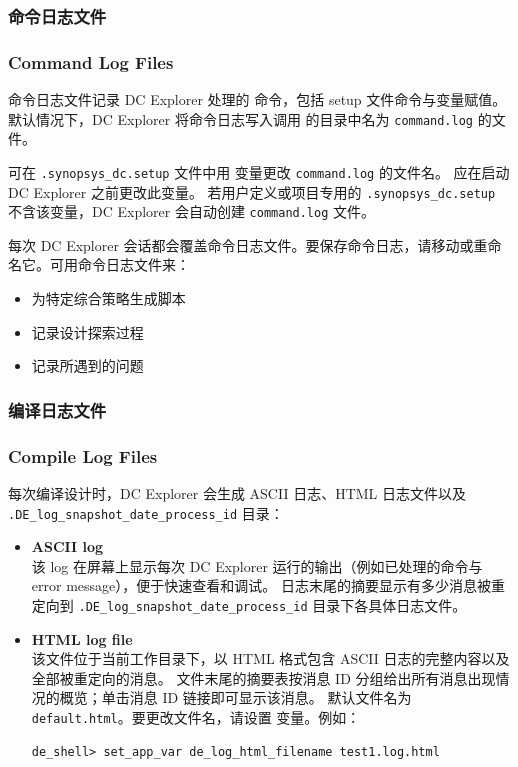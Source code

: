 \subsubsection{命令日志文件}
\subsubsection*{Command Log Files}

命令日志文件记录 DC Explorer 处理的  命令，包括 setup 文件命令与变量赋值。
默认情况下，DC Explorer 将命令日志写入调用  的目录中名为 \texttt{command.log} 的文件。

可在 \texttt{.synopsys\_dc.setup} 文件中用  变量更改 \texttt{command.log} 的文件名。
应在启动 DC Explorer 之前更改此变量。
若用户定义或项目专用的 \texttt{.synopsys\_dc.setup} 不含该变量，DC Explorer 会自动创建 \texttt{command.log} 文件。

每次 DC Explorer 会话都会覆盖命令日志文件。要保存命令日志，请移动或重命名它。可用命令日志文件来：
\begin{itemize}
  \item 为特定综合策略生成脚本
  \item 记录设计探索过程
  \item 记录所遇到的问题
\end{itemize}

\subsubsection{编译日志文件}
\subsubsection*{Compile Log Files}

每次编译设计时，DC Explorer 会生成 ASCII 日志、HTML 日志文件以及
\texttt{.DE\_log\_snapshot\_date\_process\_id} 目录：
\begin{itemize}
  \item \textbf{ASCII log}\\
        该 log 在屏幕上显示每次 DC Explorer 运行的输出（例如已处理的命令与 error message），便于快速查看和调试。
        日志末尾的摘要显示有多少消息被重定向到 \texttt{.DE\_log\_snapshot\_date\_process\_id} 目录下各具体日志文件。

  \item \textbf{HTML log file}\\
        该文件位于当前工作目录下，以 HTML 格式包含 ASCII 日志的完整内容以及全部被重定向的消息。
        文件末尾的摘要表按消息 ID 分组给出所有消息出现情况的概览；单击消息 ID 链接即可显示该消息。
        默认文件名为 \texttt{default.html}。要更改文件名，请设置  变量。例如：
\begin{lstlisting}
de_shell> set_app_var de_log_html_filename test1.log.html
\end{lstlisting}
\end{itemize}

